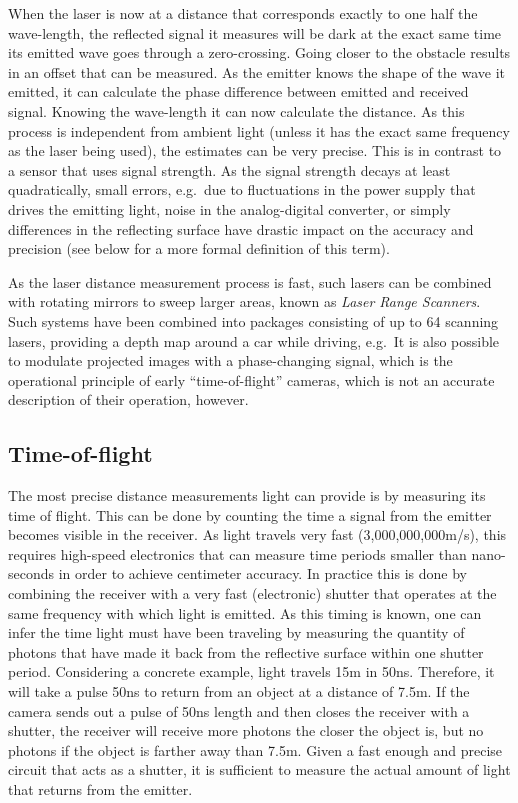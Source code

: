 When the laser is now at a distance that corresponds exactly to one half the wave-length, the reflected signal it measures will be dark at the exact same time its emitted wave goes through a zero-crossing. Going closer to the obstacle results in an offset that can be measured. As the emitter knows the shape of the wave it emitted, it can calculate the phase difference between emitted and received signal. Knowing the wave-length it can now calculate the distance. As this process is independent from ambient light (unless it has the exact same frequency as the laser being used), the estimates can be very precise. This is in contrast to a sensor that uses signal strength. As the signal strength decays at least quadratically, small errors, e.g.\ due to fluctuations in the power supply that drives the emitting light, noise in the analog-digital converter, or simply differences in the reflecting surface have drastic impact on the accuracy and precision (see below for a more formal definition of this term).

As the laser distance measurement process is fast, such lasers can be combined with rotating mirrors to sweep larger areas, known as \emph{Laser Range Scanners}. Such systems have been combined into packages consisting of up to 64 scanning lasers, providing a depth map around a car while driving, e.g.\ It is also possible to modulate projected images with a phase-changing signal, which is the operational principle of early ``time-of-flight'' cameras, which is not an accurate description of their operation, however.

\subsection{Time-of-flight}
The most precise distance measurements light can provide is by measuring its time of flight. This can be done by counting the time a signal from the emitter becomes visible in the receiver. As light travels very fast (3,000,000,000m/s), this requires high-speed electronics that can measure time periods smaller than nano-seconds in order to achieve centimeter accuracy. In practice this is done by combining the receiver with a very fast (electronic) shutter that operates at the same frequency with which light is emitted. As this timing is known, one can infer the time light must have been traveling by measuring the quantity of photons that have made it back from the reflective surface within one shutter period. Considering a concrete example, light travels 15m in 50ns. Therefore, it will take a pulse 50ns to return from an object at a distance of 7.5m. If the camera sends out a pulse of 50ns length and then closes the receiver with a shutter, the receiver will receive more photons the closer the object is, but no photons if the object is farther away than 7.5m. Given a fast enough and precise circuit that acts as a shutter, it is sufficient to measure the actual amount of light that returns from the emitter.

